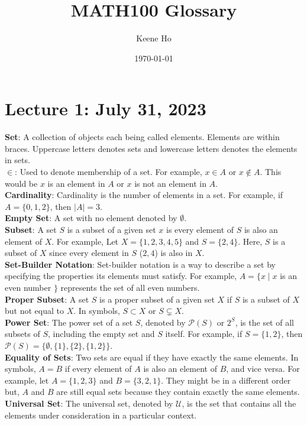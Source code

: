 \documentclass{article}
\title{MATH100 Glossary}
\author{Keene Ho}
\date{\today} %
\begin{document}
\maketitle

\section{Lecture 1: July 31, 2023}
\textbf{Set}: A collection of objects each being called elements. Elements are within braces. Uppercase letters denotes sets and lowercase letters denotes the elements in sets.\\
\textbf{\(\in\)}: Used to denote membership of a set. For example, \(x \in A\) or \(x \notin A\). This would be \(x\) is an element in \(A\) or \(x\) is not an element in \(A\).\\
\textbf{Cardinality}: Cardinality is the number of elements in a set. For example, if $A = \{0,1,2\}$, then $|A| = 3$.\\
\textbf{Empty Set}: A set with no element denoted by \(\emptyset\).\\
\textbf{Subset}: A set \(S\) is a subset of a given set \(x\) is every element of \(S\) is also an element of \(X\). For example, Let $X = \{1, 2, 3, 4, 5\}$ and $S = \{2, 4\}$. Here, $S$ is a subset of $X$ since every element in $S$ (\(2,4\)) is also in $X$.\\
\textbf{Set-Builder Notation}: Set-builder notation is a way to describe a set by specifying the properties its elements must satisfy. For example, $A = \{ x \mid x$ is an even number $\}$ represents the set of all even numbers.\\
\textbf{Proper Subset}: A set $S$ is a proper subset of a given set $X$ if $S$ is a subset of $X$ but not equal to $X$. In symbols, $S \subset X$ or \(S \subsetneq X\).\\
\textbf{Power Set}: The power set of a set $S$, denoted by $\mathcal{P}(S)$ or $2^S$, is the set of all subsets of $S$, including the empty set and $S$ itself. For example, if $S = \{1, 2\}$, then $\mathcal{P}(S) = \{\emptyset, \{1\}, \{2\}, \{1, 2\}\}$.\\
\textbf{Equality of Sets}: Two sets are equal if they have exactly the same elements. In symbols, $A = B$ if every element of $A$ is also an element of $B$, and vice versa. For example, let $A = \{1, 2, 3\}$ and $B = \{3, 2, 1\}$. They might be in a different order but, $A$ and $B$ are still equal sets because they contain exactly the same elements.\\
\textbf{Universal Set}: The universal set, denoted by $\mathcal{U}$, is the set that contains all the elements under consideration in a particular context.\\
\end{document}
